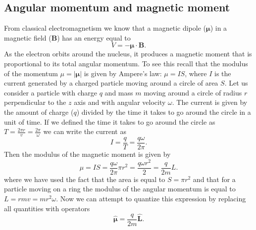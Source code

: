 \documentclass[../Main/chem331-notes.tex]{subfiles}
\begin{document}
\subsection{Angular momentum and magnetic moment}
From classical electromagnetism we know that a magnetic dipole ($\boldsymbol{\mu}$) in a magnetic field ($\mathbf{B}$) has an energy equal to
\begin{equation}
V = - \boldsymbol{\mu} \cdot \mathbf{B}.
\end{equation}
As the electron orbits around the nucleus, it produces a magnetic moment that is proportional to its total angular momentum.
To see this recall that the modulus of the momentum $\mu = |\boldsymbol{\mu}|$ is given by Ampere's law: $\mu = I S$, where $I$ is the current generated by a charged particle moving around a circle of area $S$.
Let us consider a particle with charge $q$ and mass $m$ moving around a circle of radius $r$ perpendicular to the $z$ axis and with angular velocity $\omega$.
The current is given by the amount of charge ($q$) divided by the time it takes to go around the circle in a unit of time. If we defined the time it takes to go around the circle as $T = \frac{2 \pi r }{v} =\frac{2 \pi }{\omega}$ we can write the current as
\begin{equation}
I = \frac{q}{T} = \frac{q \omega}{2 \pi}.
\end{equation}
Then the modulus of the magnetic moment is given by
\begin{equation}
\mu = I S = \frac{q \omega}{2 \pi} \pi r^2 = \frac{q \omega r^2}{2} = \frac{q}{2m} L.
\end{equation}
where we have used the fact that the area is equal to $S = \pi r^2$ and that for a particle moving on a ring the modulus of the angular momentum is equal to $L = r mv = m r^2 \omega$.
Now we can attempt to quantize this expression by replacing all quantities with operators
\begin{equation}
\hat{\boldsymbol{\mu}} =  \frac{q}{2m} \hat{\mathbf{L}}.
\end{equation}

\end{document}
